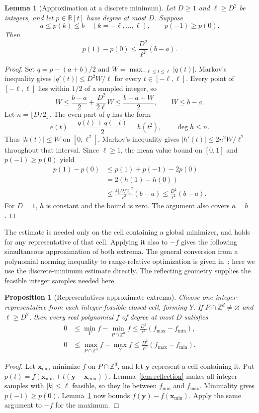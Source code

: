 \documentclass[11pt]{article}
\newtheorem{lemma}[theorem]{Lemma}
\newtheorem{proposition}[theorem]{Proposition}
\theoremstyle{definition}\newtheorem{definition}{Definition}[section]
\theoremstyle{remark}\newtheorem{remark}[theorem]{Remark}
\newcommand{\R}{\mathbb R}\newcommand{\Q}{\mathbb Q}\newcommand{\Z}{\mathbb Z}
\begin{document}
\begin{lemma}[Approximation at a discrete minimum]\label{lem:markov}
Let $D\ge1$ and $\ell\ge D^2$ be integers, and let $p\in\R[t]$ have degree at most $D$. Suppose
\[
 a\le p(k)\le b\quad(k=-\ell,\ldots,\ell),\qquad p(-1)\ge p(0).
\]
Then
\[
 p(1)-p(0)\le \frac{D^2}{\ell^2}(b-a).
\]
\end{lemma}
\begin{proof}
Set $q=p-(a+b)/2$ and $W=\max_{-\ell\le t\le\ell}|q(t)|$. Markov's inequality gives $|q'(t)|\le D^2W/\ell$ for every $t\in[-\ell,\ell]$. Every point of $[-\ell,\ell]$ lies within $1/2$ of a sampled integer, so
\[
 W\le \frac{b-a}{2}+\frac{D^2}{2\ell}W\le\frac{b-a+W}{2},
 \qquad W\le b-a.
\]
Let $n=\lfloor D/2\rfloor$. The even part of $q$ has the form
\[
 e(t)=\frac{q(t)+q(-t)}2=h(t^2),\qquad \deg h\le n.
\]
Thus $|h(t)|\le W$ on $[0,\ell^2]$. Markov's inequality gives $|h'(t)|\le 2n^2W/\ell^2$ throughout that interval. Since $\ell\ge1$, the mean value bound on $[0,1]$ and $p(-1)\ge p(0)$ yield
\[
\begin{aligned}
 p(1)-p(0)&\le p(1)+p(-1)-2p(0)\\
 &=2(h(1)-h(0))\\
 &\le\frac{4\lfloor D/2\rfloor^2}{\ell^2}(b-a)
 \le\frac{D^2}{\ell^2}(b-a).
\end{aligned}
\]
For $D=1$, $h$ is constant and the bound is zero. The argument also covers $a=b$.
\end{proof}

The estimate is needed only on the cell containing a global minimizer, and holds for any representative of that cell. Applying it also to $-f$ gives the following simultaneous approximation of both extrema. The general conversion from a polynomial norming inequality to range-relative optimization is given in~\cite[Proposition~1]{PV}; here we use the discrete-minimum estimate directly. The reflecting geometry supplies the feasible integer samples needed here.

\begin{proposition}[Representatives approximate extrema]\label{prop:extrema}
Choose one integer representative from each integer-feasible closed cell, forming $Y$. If $P\cap\Z^d\ne\varnothing$ and $\ell\ge D^2$, then every real polynomial $f$ of degree at most $D$ satisfies
\[
\begin{aligned}
 0&\le\min_Y f-\min_{P\cap\Z^d} f\le\frac{D^2}{\ell^2}(f_{\max}-f_{\min}),\\
 0&\le\max_{P\cap\Z^d} f-\max_Y f\le\frac{D^2}{\ell^2}(f_{\max}-f_{\min}).
\end{aligned}
\]
\end{proposition}
\begin{proof}
Let $\mathbf{x}_{\min}$ minimize $f$ on $P\cap\Z^d$, and let $\mathbf{y}$ represent a cell containing it. Put $p(t)=f(\mathbf{x}_{\min}+t(\mathbf{y}-\mathbf{x}_{\min}))$. Lemma~\ref{lem:reflection} makes all integer samples with $|k|\le \ell$ feasible, so they lie between $f_{\min}$ and $f_{\max}$. Minimality gives $p(-1)\ge p(0)$. Lemma~\ref{lem:markov} now bounds $f(\mathbf{y})-f(\mathbf{x}_{\min})$. Apply the same argument to $-f$ for the maximum.
\end{proof}
\end{document}
